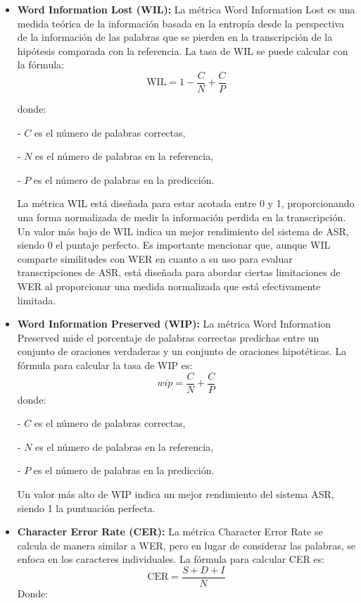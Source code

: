\documentclass[conference]{IEEEtran}
\begin{document}
\begin{itemize}
    \item \textbf{Word Information Lost (WIL):} La métrica Word Information Lost es una medida teórica de la información basada en la entropía desde la perspectiva de la información de las palabras que se pierden en la transcripción de la hipótesis comparada con la referencia. La tasa de WIL se puede calcular con la fórmula:
    \begin{equation}
        \text{WIL} = 1 - \frac{C}{N} + \frac{C}{P}
    \end{equation}
    
    donde:
    
    - \( C \) es el número de palabras correctas,
    
    - \( N \) es el número de palabras en la referencia,
    
    - \( P \) es el número de palabras en la predicción.
    
    La métrica WIL está diseñada para estar acotada entre 0 y 1, proporcionando una forma normalizada de medir la información perdida en la transcripción. Un valor más bajo de WIL indica un mejor rendimiento del sistema de ASR, siendo 0 el puntaje perfecto. Es importante mencionar que, aunque WIL comparte similitudes con WER en cuanto a su uso para evaluar transcripciones de ASR, está diseñada para abordar ciertas limitaciones de WER al proporcionar una medida normalizada que está efectivamente limitada.
    
    \item \textbf{Word Information Preserved (WIP):} La métrica Word Information Preserved mide el porcentaje de palabras correctas predichas entre un conjunto de oraciones verdaderas y un conjunto de oraciones hipotéticas. La fórmula para calcular la tasa de WIP es:
    \begin{equation}
        wip = \frac{C}{N} + \frac{C}{P}
    \end{equation}
    donde:
    
    - \( C \) es el número de palabras correctas,
    
    - \( N \) es el número de palabras en la referencia,
    
    - \( P \) es el número de palabras en la predicción.
    
    Un valor más alto de WIP indica un mejor rendimiento del sistema ASR, siendo 1 la puntuación perfecta.
    \item \textbf{Character Error Rate (CER):} La métrica Character Error Rate se calcula de manera similar a WER, pero en lugar de considerar las palabras, se enfoca en los caracteres individuales. La fórmula para calcular CER es:
    \begin{equation}
        \text{CER} = \frac{S + D + I}{N}
    \end{equation}
    Donde:
    

\end{itemize}
\end{document}

